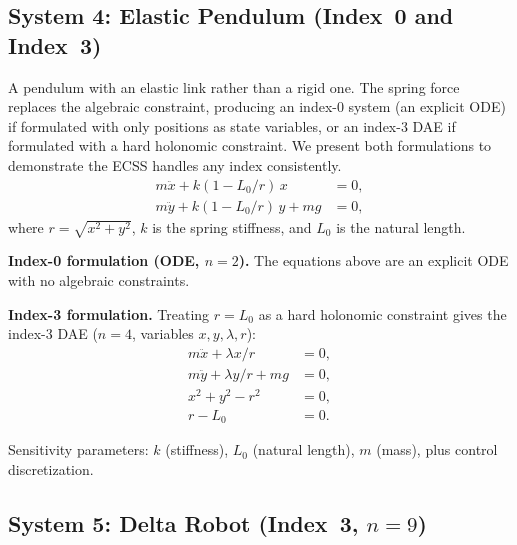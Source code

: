 \documentclass[12pt,a4paper]{article}
\theoremstyle{definition}
\theoremstyle{plain}
\begin{document}
\subsection{System 4: Elastic Pendulum (Index~0 and Index~3)}

A pendulum with an elastic link rather than a rigid one. The spring force replaces the algebraic constraint, producing an index-0 system (an explicit ODE) if formulated with only positions as state variables, or an index-3 DAE if formulated with a hard holonomic constraint. We present both formulations to demonstrate the ECSS handles any index consistently.
\begin{equation}
  \begin{aligned}
    m\ddot{x} + k(1 - L_0/r)\,x &= 0,\\
    m\ddot{y} + k(1 - L_0/r)\,y + mg &= 0,
  \end{aligned}
\end{equation}
where $r = \sqrt{x^2+y^2}$, $k$ is the spring stiffness, and $L_0$ is the natural length.

\textbf{Index-0 formulation (ODE, $n=2$).} The equations above are an explicit ODE with no algebraic constraints.

\textbf{Index-3 formulation.} Treating $r=L_0$ as a hard holonomic constraint gives the index-3 DAE ($n=4$, variables $x,y,\lambda,r$):
\begin{equation}
  \begin{aligned}
    m\ddot{x} + \lambda x/r &= 0,\\
    m\ddot{y} + \lambda y/r + mg &= 0,\\
    x^2 + y^2 - r^2 &= 0,\\
    r - L_0 &= 0.
  \end{aligned}
\end{equation}

Sensitivity parameters: $k$ (stiffness), $L_0$ (natural length), $m$ (mass), plus control discretization.

\subsection{System 5: Delta Robot (Index~3, $n=9$)}
\end{document}

